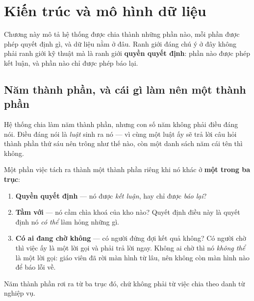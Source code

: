 \chapter{Kiến trúc và mô hình dữ liệu}
\label{ch:kien-truc-va-du-lieu}

Chương này mô tả hệ thống được chia thành những phần nào, mỗi phần được phép quyết định gì, và
dữ liệu nằm ở đâu. Ranh giới đáng chú ý ở đây không phải ranh giới kỹ thuật mà là ranh giới
\textbf{quyền quyết định}: phần nào được phép kết luận, và phần nào chỉ được phép báo lại.

\section{Năm thành phần, và cái gì làm nên một thành phần}

Hệ thống chia làm năm thành phần, nhưng con số năm không phải điều đáng nói. Điều đáng nói là
\emph{luật} sinh ra nó --- vì cùng một luật ấy sẽ trả lời câu hỏi thành phần thứ sáu nên trông
như thế nào, còn một danh sách năm cái tên thì không.

Một phần việc tách ra thành một thành phần riêng khi nó khác ở \textbf{một trong ba trục}:

\begin{enumerate}
  \item \textbf{Quyền quyết định} --- nó được \emph{kết luận}, hay chỉ được \emph{báo lại}?
  \item \textbf{Tầm với} --- nó cầm chìa khoá của kho nào? Quyết định điều này là quyết định
        nó \emph{có thể} làm hỏng những gì.
  \item \textbf{Có ai đang chờ không} --- có người đứng đợi kết quả không? Có người chờ thì việc
        ấy là một lời gọi và phải trả lời ngay. Không ai chờ thì nó \emph{không thể} là một lời
        gọi: giáo viên đã rời màn hình từ lâu, nên không còn màn hình nào để báo lỗi về.
\end{enumerate}

Năm thành phần rơi ra từ ba trục đó, chứ không phải từ việc chia theo danh từ nghiệp vụ.

